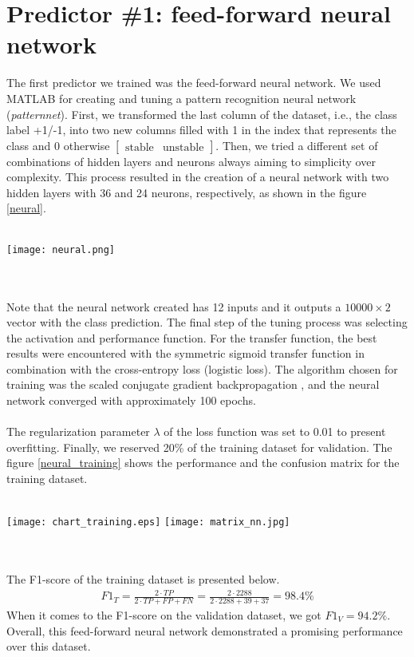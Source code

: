 \documentclass{article}
\newcommand{\enterProblemHeader}[1]{
\nobreak\extramarks{#1}{#1}\nobreak
\nobreak\extramarks{#1}{#1}\nobreak
}
\newcommand{\exitProblemHeader}[1]{
\nobreak\extramarks{#1}{#1}\nobreak
\nobreak\extramarks{#1}{}\nobreak
}
\newcounter{homeworkProblemCounter} %
\newcommand{\homeworkProblemName}{}
\newenvironment{homeworkProblem}[1][Problem \arabic{homeworkProblemCounter}]{ %
\stepcounter{homeworkProblemCounter} %
\renewcommand{\homeworkProblemName}{#1} %
\section{\homeworkProblemName} %
\enterProblemHeader{} %
}{
\exitProblemHeader{} %
}
\begin{document}
\begin{homeworkProblem}[Predictor \#1: feed-forward neural network]
The first predictor we trained was the feed-forward neural network. We used MATLAB for creating and tuning a pattern recognition neural network (\textit{patternnet}). First, we transformed the last column of the dataset, i.e., the class label +1/-1, into two new columns filled with 1 in the index that represents the class and 0 otherwise $\left[ \begin{smallmatrix}\text{stable}&  \text{unstable}\end{smallmatrix}\right]$. Then, we tried a different set of combinations of hidden layers and neurons always aiming to simplicity over complexity. This process resulted in the creation of a neural network with two hidden layers with 36 and 24 neurons, respectively, as shown in the figure \ref{neural}. 
\\
\\
\begin{minipage}{\textwidth}
\centering
    \texttt{[image: neural.png]}
 \label{neural}
\end{minipage}
\\
\\
Note that the neural network created has 12 inputs and it outputs a $10000\times 2$ vector with the class prediction. The final step of the tuning process was selecting the activation and performance function. For the transfer function, the best results were encountered with the symmetric sigmoid transfer function \cite{matlab} in combination with the cross-entropy loss (logistic loss). The algorithm chosen for training was the scaled conjugate gradient backpropagation \cite{matlab2}, and the neural network converged with approximately 100 epochs.
\\
\\
The regularization parameter $\lambda$ of the loss function was set to 0.01 to present overfitting. Finally, we reserved 20\% of the training dataset for validation. The figure \ref{neural_training} shows the performance and the confusion matrix for the training dataset.
\\
\\
\begin{minipage}{\textwidth}
\centering
    \texttt{[image: chart\_training.eps]}
    \texttt{[image: matrix\_nn.jpg]}
 \label{neural_training}
\end{minipage}
\\
\\
The F1-score of the training dataset is presented below.
\begin{gather*}
    F1_T = \frac{2\cdot TP}{2\cdot TP + FP + FN} = \frac{2\cdot 2288}{2\cdot 2288 + 39 + 37} = \boldsymbol{98.4\%}
\end{gather*}
When it comes to the F1-score on the validation dataset, we got $F1_{V} = 94.2\%$. Overall, this feed-forward neural network  demonstrated a promising performance over this dataset. 
\end{homeworkProblem}
\end{document}
